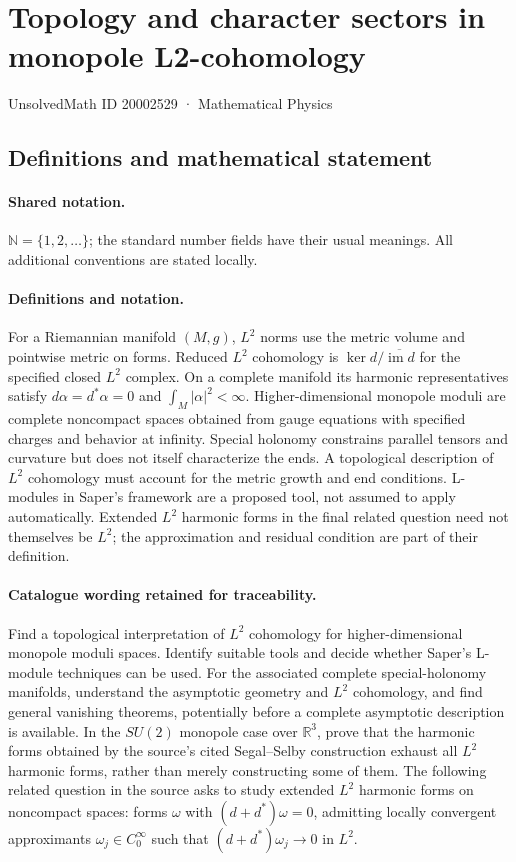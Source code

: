 \documentclass[11pt]{article}
\begin{document}
\setcounter{section}{20002528}
\section{Topology and character sectors in monopole L2-cohomology}\label{20002529}
{\small UnsolvedMath ID 20002529 · Mathematical Physics}
\subsection{Definitions and mathematical statement}

\paragraph{Shared notation.}$\mathbb N=\{1,2,\ldots\}$; the standard number fields have their usual meanings. All additional conventions are stated locally.


\paragraph{Definitions and notation.}For a Riemannian manifold $(M,g)$, $L^2$ norms use the metric volume and pointwise metric on forms. Reduced $L^2$ cohomology is $\ker d/\overline{\operatorname{im}d}$ for the specified closed $L^2$ complex. On a complete manifold its harmonic representatives satisfy $d\alpha=d^*\alpha=0$ and $\int_M|\alpha|^2<\infty$. Higher-dimensional monopole moduli are complete noncompact spaces obtained from gauge equations with specified charges and behavior at infinity. Special holonomy constrains parallel tensors and curvature but does not itself characterize the ends. A topological description of $L^2$ cohomology must account for the metric growth and end conditions. L-modules in Saper’s framework are a proposed tool, not assumed to apply automatically. Extended $L^2$ harmonic forms in the final related question need not themselves be $L^2$; the approximation and residual condition are part of their definition.

\paragraph{Catalogue wording retained for traceability.}
Find a topological interpretation of $L^2$ cohomology for higher-dimensional monopole moduli spaces. Identify suitable tools and decide whether Saper’s L-module techniques can be used. For the associated complete special-holonomy manifolds, understand the asymptotic geometry and $L^2$ cohomology, and find general vanishing theorems, potentially before a complete asymptotic description is available. In the $SU(2)$ monopole case over $\mathbb R^3$, prove that the harmonic forms obtained by the source's cited Segal--Selby construction exhaust all $L^2$ harmonic forms, rather than merely constructing some of them. The following related question in the source asks to study extended $L^2$ harmonic forms on noncompact spaces: forms $\omega$ with $(d+d^*)\omega=0$, admitting locally convergent approximants $\omega_j\in C_0^\infty$ such that $(d+d^*)\omega_j\to0$ in $L^2$.
\end{document}
